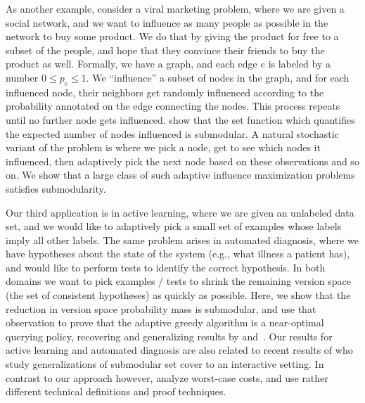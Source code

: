 As another example, consider a viral marketing problem, where we are
given a social network, and we want to influence as many people as
possible in the network to buy some product. We do that by giving the
product for free to a subset of the people, and hope that they
convince their friends to buy the product as well.  Formally, we have
a graph, and each edge $e$ is labeled by a number $0\leq p_e\leq 1$.  We ``influence'' a subset of nodes in the graph, and for each influenced node, their neighbors get randomly influenced according to the probability annotated on the edge connecting the nodes.  This process repeats until no further node gets influenced.  \citet{kempe03} show that the set function which quantifies the expected number of nodes influenced is submodular.  A natural stochastic variant of the problem is where we pick a node, get to see which nodes it influenced, then adaptively pick the next node based on these observations and so on.  We show that a large class of such adaptive influence maximization problems satisfies \term submodularity.


Our third application is in active learning, 
where we are given an unlabeled data set, and we would like to
adaptively pick a small set of examples whose labels imply all other
labels.  The same problem arises in automated diagnosis, where we have
hypotheses about the state of the system (e.g., what illness a patient has), and would like to perform tests to identify the correct hypothesis.
In both domains we want to pick examples / tests to shrink the remaining
version space (the set of consistent hypotheses) as quickly as
possible. Here, we show that the reduction in version space
probability mass is
\term submodular, and use that observation to prove that the adaptive
greedy algorithm is a near-optimal querying policy, recovering and 
%
generalizing  
results by \citet{kosaraju99} and~\citet{dasgupta04}. Our results for active learning and automated diagnosis are also related to recent results of \citet{guillory10interactive,guillory2011-noisy-interactive-submod-cover} who study generalizations of submodular set cover to an interactive setting.  In contrast to our approach however, \citeauthor{guillory10interactive} analyze worst-case costs, and use rather different technical definitions and proof techniques.


